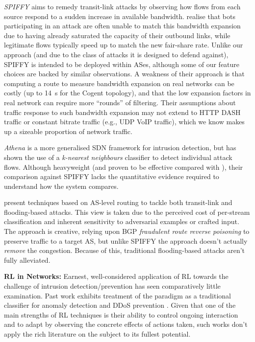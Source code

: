 \documentclass[10pt, times, comsoc]{IEEEtran}
\newcommand{\fakepara}[1]{\noindent\textbf{#1:}}
\begin{document}
\emph{SPIFFY} \cite{DBLP:conf/ndss/KangGS16} aims to remedy transit-link attacks by observing how flows from each source respond to a sudden increase in available bandwidth.
 realise that bots participating in an attack are often unable to match this bandwidth expansion due to having already saturated the capacity of their outbound links, while legitimate flows typically speed up to match the new fair-share rate.
Unlike our approach (and due to the class of attacks it is designed to defend against), SPIFFY is intended to be deployed within ASes, although some of our feature choices are backed by similar observations.
A weakness of their approach is that computing a route to measure bandwidth expansion on real networks can be costly (up to \SI{14}{\second} for the Cogent topology), and that the low expansion factors in real network can require more ``rounds'' of filtering. 
Their assumptions about traffic response to such bandwidth expansion may not extend to HTTP DASH traffic or constant bitrate traffic (e.g., UDP VoIP traffic), which we know makes up a sizeable proportion of network traffic.

\emph{Athena} \cite{DBLP:conf/dsn/LeeKSPY17} is a more generalised SDN framework for intrusion detection, but has shown the use of a \emph{k-nearest neighbours} classifier to detect individual attack flows.
Although heavyweight (and proven to be effective compared with \textcite{DBLP:conf/lcn/BragaMP10}), their comparison against SPIFFY lacks the quantitative evidence required to understand how the system compares.

\Textcite{DBLP:conf/sp/SmithS18} present techniques based on AS-level routing to tackle both transit-link and flooding-based attacks.
This view is taken due to the perceived cost of per-stream classification and inherent sensitivity to adversarial examples or crafted input.
The approach is creative, relying upon BGP \emph{fraudulent route reverse poisoning} to preserve traffic to a target AS, but unlike SPIFFY the approach doesn't actually \emph{remove} the congestion.
Because of this, traditional flooding-based attacks aren't fully alleviated.

\fakepara{RL in Networks}
Earnest, well-considered application of RL towards the challenge of intrusion detection/prevention has seen comparatively little examination.
Past work exhibits treatment of the paradigm as a traditional classifier for anomaly detection \cite{shamshirband2014anomaly} and DDoS prevention \cite{DBLP:conf/mates/ServinK08}.
Given that one of the main strengths of RL techniques is their ability to control ongoing interaction and to adapt by observing the concrete effects of actions taken, such works don't apply the rich literature on the subject to its fullest potential.
\end{document}
